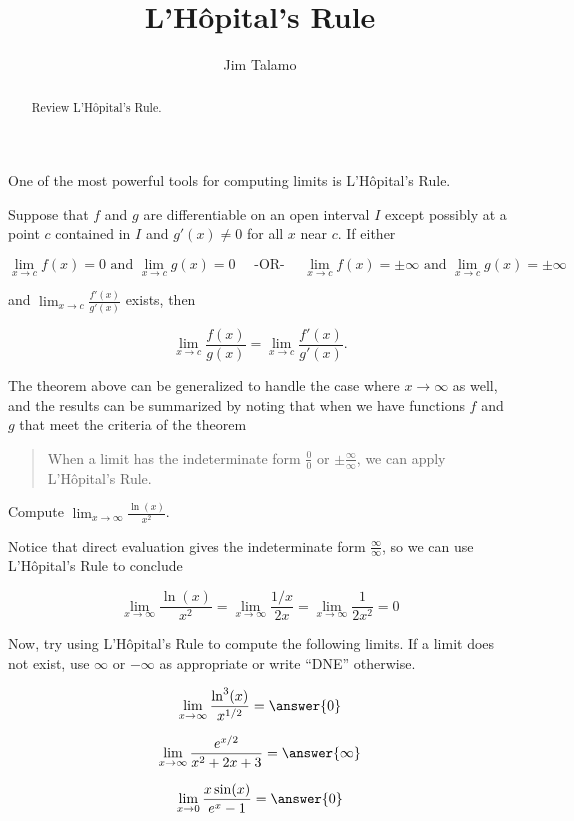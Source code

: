 \documentclass{ximera}
\author{Jim Talamo}
\title[Refresh:]{ L'H\^{o}pital's Rule}
\begin{document}
\begin{abstract}
Review  L'H\^{o}pital's Rule.
\end{abstract}
\maketitle

\begin{problem}
One of the most powerful tools for computing limits is L'H\^{o}pital's Rule.

\begin{theorem}
Suppose that $f$ and $g$ are differentiable on an open interval $I$ except possibly at a point $c$ contained in $I$ and $g'(x) \neq 0$
for all $x$ near $c$.  If either

\[ \lim _{x\to c}f(x)=0 \textrm{ and } \lim _{x\to c}g(x)=0 \quad  \textrm{ -OR- }  \quad \lim _{x\to c}f(x)= \pm \infty \textrm{ and } \lim _{x\to c}g(x)=\pm \infty\]

and $\lim_{x \to c} \frac{f'(x)}{g'(x)}$ exists, then

\[
\lim_{x \to c} \frac{f(x)}{g(x)} = \lim_{x \to c} \frac{f'(x)}{g'(x)}.
\]
\end{theorem}

The theorem above can be generalized to handle the case where $x \to \infty$ as well, and the results can be summarized by noting that when we have functions $f$ and $g$ that meet the criteria of the theorem

\begin{quote}
When a limit has the indeterminate form $\frac{0}{0}$ or $\pm \frac{\infty}{\infty}$, we can apply L'H\^{o}pital's Rule.
\end{quote}

\begin{example}
Compute $\lim_{x \to \infty} \frac{\ln(x)}{x^2}$.

\begin{explanation}
Notice that direct evaluation gives the indeterminate form $\frac{\infty}{\infty}$, so we can use L'H\^{o}pital's Rule to conclude

\[
\lim_{x \to \infty} \frac{\ln(x)}{x^2} = \lim_{x \to \infty} \frac{1/x}{2x} = \lim_{x \to \infty} \frac{1}{2x^2} =0
\]
\end{explanation}
\end{example}

Now, try using L'H\^{o}pital's Rule to compute the following limits.  If a limit does not exist, use $\infty$ or $-\infty$ as appropriate or write ``DNE'' otherwise.

\begin{exercise}
\[
\lim_{x \to \infty} \frac{\ln^3(x)}{x^{1/2}} = \answer{0}  
\]
\end{exercise}

\begin{exercise}
\[
\lim_{x \to \infty} \frac{e^{x/2}}{x^2+2x+3} = \answer{\infty}  
\]
\end{exercise}

\begin{exercise}
\[
\lim_{x \to 0} \frac{x \sin(x)}{e^x-1} = \answer{0}  
\]
\end{exercise}

\end{problem}
\end{document}

